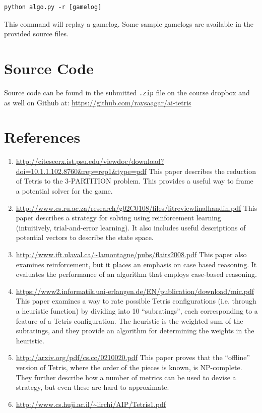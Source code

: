 \documentclass[12pt]{article}
\begin{document}
\begin{verbatim}
python algo.py -r [gamelog]
\end{verbatim}
This command will replay a gamelog. Some sample gamelogs are available in the provided source files.

\section{Source Code}   
Source code can be found in the submitted \verb|.zip| file on the course dropbox and as well on Github at: \url{https://github.com/raysaagar/ai-tetris}

\section{References}
\begin{enumerate}
\item \url{http://citeseerx.ist.psu.edu/viewdoc/download?doi=10.1.1.102.8760&rep=rep1&type=pdf}
This paper describes the reduction of Tetris to the 3-PARTITION problem. This provides a useful way to frame a potential solver for the game.
\item \url{http://www.cs.ru.ac.za/research/g02C0108/files/litreviewfinalhandin.pdf}
This paper describes a strategy for solving using reinforcement learning (intuitively, trial-and-error learning). It also includes useful descriptions of potential vectors to describe the state space.
\item \url{http://www.ift.ulaval.ca/~lamontagne/pubs/flairs2008.pdf}
This paper also examines reinforcement, but it places an emphasis on case based reasoning. It evaluates the performance of an algorithm that employs case-based reasoning.
\item \url{https://www2.informatik.uni-erlangen.de/EN/publication/download/mic.pdf}
This paper examines a way to rate possible Tetris configurations (i.e. through a heuristic function) by dividing into 10 “subratings”, each corresponding to a feature of a Tetris configuration. The heuristic is the weighted sum of the subratings, and they provide an algorithm for determining the weights in the heuristic.
\item   \url{http://arxiv.org/pdf/cs.cc/0210020.pdf}
This paper proves that the “offline” version of Tetris, where the order of the pieces is known, is NP-complete. They further describe how a number of metrics can be used to devise a strategy, but even these are hard to approximate.
\item \url{http://www.cs.huji.ac.il/~lirchi/AIP/Tetris1.pdf}

\end{enumerate}
\end{document}
